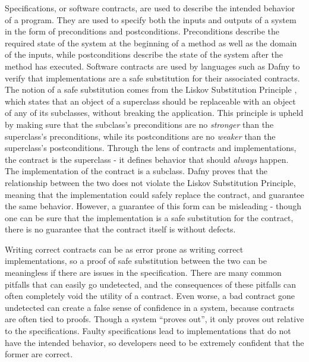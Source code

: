\documentclass{article}
\begin{document}
Specifications, or software contracts, are used to describe the intended behavior of a program. They are used
to specify both the inputs and outputs of a system in the form of preconditions and postconditions. Preconditions
describe the required state of the system at the beginning of a method as well as the domain of the inputs,
while postconditions describe the state of the system after the method has executed. Software contracts
are used by languages such as Dafny to verify that implementations are a safe substitution for their associated contracts. 
The notion of a safe substitution comes from the Liskov Substitution Principle \cite{liskov1987keynote}, which states that 
an object of a superclass should be replaceable with an object of any of its subclasses, without breaking the application. 
This principle is upheld by making sure that the subclass's preconditions are no {\it stronger} than the superclass's 
preconditions, while its postconditions are no {\it weaker} than the superclass's postconditions. Through the lens of 
contracts and implementations, the contract is the superclass - it defines behavior that should {\it always} happen. The 
implementation of the contract is a subclass. Dafny proves that the relationship between the two does not violate the 
Liskov Substitution Principle, meaning that the implementation could safely replace the contract, and guarantee the 
same behavior. However, a guarantee of this form can be misleading - though one can be sure that the implementation is a 
safe substitution for the contract, there is no guarantee that the contract itself is without defects.

Writing correct contracts can be as error prone as writing correct implementations, so a proof of safe substitution 
between the two can be meaningless if there are issues in the specification. There are many common pitfalls
that can easily go undetected, and the consequences of these pitfalls can often completely void the utility of
a contract. Even worse, a bad contract gone undetected can create a false sense of confidence in a system,
because contracts are often tied to proofs. Though a system “proves out”, it only proves out relative to the
specifications. Faulty specifications lead to implementations that do not have the intended behavior, so developers 
need to be extremely confident that the former are correct. 
\end{document}
